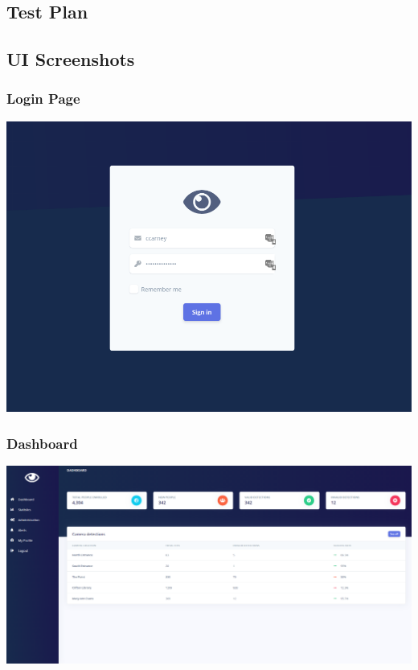 \documentclass[
  english,
  a4paper,
,tablecaptionabove
]{scrartcl}
\begin{document}
\hypertarget{test-plan-1}{%
\subsection{Test Plan}\label{test-plan-1}}

\hypertarget{ui-screenshots}{%
\subsection{UI Screenshots}\label{ui-screenshots}}

\hypertarget{login-page}{%
\subsubsection{Login Page}\label{login-page}}

\includegraphics{images/ppm-images/login.png} \newpage

\hypertarget{dashboard-1}{%
\subsubsection{Dashboard}\label{dashboard-1}}

\includegraphics{images/ppm-images/dashboard.png} \newpage
\end{document}
